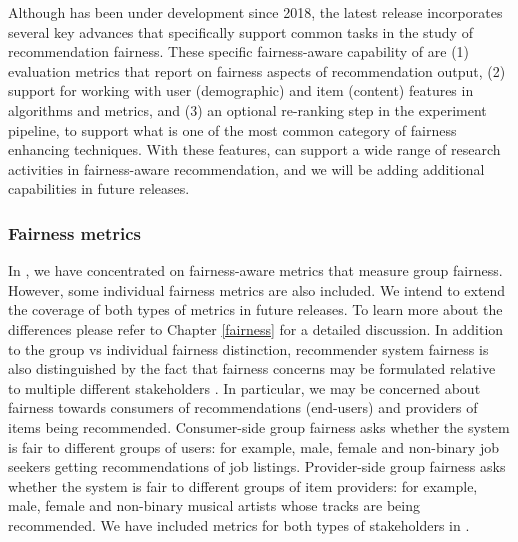 Although \libauto{} has been under development since 2018, the latest release incorporates several key advances that specifically support common tasks in the study of recommendation fairness. These specific fairness-aware capability of \libauto{} are (1) evaluation metrics that report on fairness aspects of recommendation output, (2) support for working with user (demographic) and item (content) features in algorithms and metrics, and (3) an optional re-ranking step in the experiment pipeline, to support what is one of the most common category of fairness enhancing techniques.
With these features, \libauto{} can support a wide range of research activities in fairness-aware recommendation, and we will be adding additional capabilities in future releases.


\subsubsection{Fairness metrics}
\label{subsubsec:libauto_fairmetrics}



In \libauto{}, we have concentrated on fairness-aware metrics that measure group fairness. However, some individual fairness metrics are also included. We intend to extend the coverage of both types of metrics in future releases. To learn more about the differences please refer to Chapter \ref{fairness} for a detailed discussion.
In addition to the group vs individual fairness distinction, recommender system fairness is also distinguished by the fact that fairness concerns may be formulated relative to multiple different stakeholders \cite{burke2017multisided,abdollahpouri2020multistakeholder}. In particular, we may be concerned about fairness towards consumers of recommendations (end-users) and providers of items being recommended. Consumer-side group fairness asks whether the system is fair to different groups of users: for example, male, female and non-binary job seekers getting recommendations of job listings. Provider-side group fairness asks whether the system is fair to different groups of item providers: for example, male, female and non-binary musical artists whose tracks are being recommended. We have included metrics for both types of stakeholders in \libauto{}.


